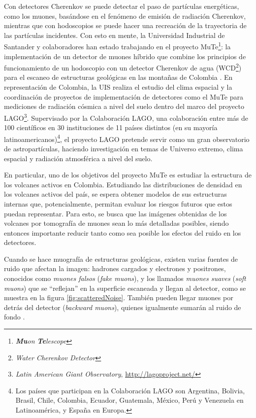 \documentclass[12pt]{report}
\begin{document}
Con detectores Cherenkov se puede detectar el paso de partículas energéticas, como los muones, basándose en el fenómeno de emisión de radiación Cherenkov, mientras que con hodoscopios se puede hacer una recreación de la trayectoria de las partículas incidentes. Con esto en mente, la Universidad Industrial de Santander y colaboradores han estado trabajando en el proyecto MuTe\footnote{\textit{\textbf{Mu}on \textbf{Te}lescope}}: la implementación de un detector de muones híbrido que combine los principios de funcionamiento de un hodoscopio con un detector Cherenkov de agua (WCD\footnote{\textit{Water Cherenkov Detector}}) para el escaneo de estructuras geológicas en las montañas de Colombia \cite{rodriguez2018minimute}. En representación de Colombia, la UIS realiza el estudio del clima espacial y la coordinación de proyectos de implementación de detectores como el MuTe para mediciones de radiación cósmica a nivel del suelo dentro del marco del proyecto LAGO\footnote{\textit{Latin American Giant Observatory}, \url{http://lagoproject.net/}}. Supervisado por la Colaboración LAGO, una colaboración entre más de 100 científicos en 30 instituciones de 11 países distintos (en su mayoría latinoamericanos)\footnote{Los países que participan en la Colaboración LAGO son Argentina, Bolivia, Brasil, Chile, Colombia, Ecuador, Guatemala, México, Perú y Venezuela en Latinoamérica, y España en Europa.}, el proyecto LAGO pretende servir como un gran observatorio de astropartículas, haciendo investigación en temas de Universo extremo, clima espacial y radiación atmosférica a nivel del suelo.

En particular, uno de los objetivos del proyecto MuTe es estudiar la estructura de los volcanes activos en Colombia. Estudiando las distribuciones de densidad en los volcanes activos del país, se espera obtener modelos de sus estructuras internas que, potencialmente, permitan evaluar los riesgos futuros que estos puedan representar. Para esto, se busca que las imágenes obtenidas de los volcanes por tomografía de muones sean lo más detalladas posibles, siendo entonces importante reducir tanto como sea posible los efectos del ruido en los detectores.

Cuando se hace muografía de estructuras geológicas, existen varias fuentes de ruido que afectan la imagen: hadrones cargados y electrones y positrones, conocidos como \textit{muones falsos} (\textit{fake muons}), y los llamados \textit{muones suaves} (\textit{soft muons}) que se ``reflejan'' en la superficie escaneada y llegan al detector, como se muestra en la figura \ref{fig:scatteredNoise}. También pueden llegar muones por detrás del detector (\textit{backward muons}), quienes igualmente sumarán al ruido de fondo \cite{bonechi2020atmospheric}.
\end{document}

